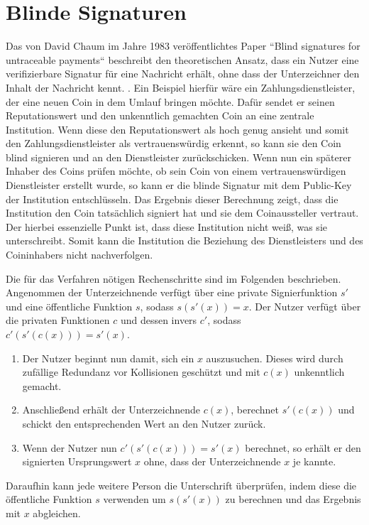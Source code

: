 \documentclass[
	fontsize=12pt,
	headings=small,
	parskip=half,           %
	bibliography=totoc,
	numbers=noenddot,       %
	open=any,               %
]{scrreprt}
\begin{document}
\section{Blinde Signaturen}
\label{sec:blindSig}
Das von David Chaum im Jahre 1983 veröffentlichtes Paper ``Blind signatures for untraceable payments`` beschreibt den theoretischen Ansatz, dass ein Nutzer eine verifizierbare Signatur für eine Nachricht erhält, ohne dass der Unterzeichner den Inhalt der Nachricht kennt. \cite{chaum1983blind}. Ein Beispiel hierfür wäre ein Zahlungsdienstleister, der eine neuen Coin in dem Umlauf bringen möchte. Dafür sendet er seinen Reputationswert und den unkenntlich gemachten Coin an eine zentrale Institution. Wenn diese den Reputationswert als hoch genug ansieht und somit den Zahlungsdienstleister als vertrauenswürdig erkennt, so kann sie den Coin blind signieren und an den Dienstleister zurückschicken. Wenn nun ein späterer Inhaber des Coins prüfen möchte, ob sein Coin von einem vertrauenswürdigen Dienstleister erstellt wurde, so kann er die blinde Signatur mit dem Public-Key der Institution entschlüsseln. Das Ergebnis dieser Berechnung zeigt, dass die Institution den Coin tatsächlich signiert hat und sie dem Coinaussteller vertraut. Der hierbei essenzielle Punkt ist, dass diese Institution nicht weiß, was sie unterschreibt. Somit kann die Institution die Beziehung des Dienstleisters und des Coininhabers nicht nachverfolgen. 

Die für das Verfahren nötigen Rechenschritte sind im Folgenden beschrieben. Angenommen der Unterzeichnende verfügt über eine private Signierfunktion $s'$ und eine öffentliche Funktion $s$, sodass $s(s'(x)) = x$. Der Nutzer verfügt über die privaten Funktionen $c$ und dessen invers $c'$, sodass $c'(s'(c(x))) = s'(x)$. 
\begin{enumerate}
    \item Der Nutzer beginnt nun damit, sich ein $x$ auszusuchen. Dieses wird durch zufällige Redundanz vor Kollisionen geschützt und mit $c(x)$ unkenntlich gemacht.
    \item Anschließend erhält der Unterzeichnende $c(x)$, berechnet $s'(c(x))$ und schickt den entsprechenden Wert an den Nutzer zurück.
    \item Wenn der Nutzer nun $c'(s'(c(x))) = s'(x)$ berechnet, so erhält er den signierten Ursprungswert $x$ ohne, dass der Unterzeichnende $x$ je kannte.
\end{enumerate}
Daraufhin kann jede weitere Person die Unterschrift überprüfen, indem diese die öffentliche Funktion $s$ verwenden um $s(s'(x))$ zu berechnen und das Ergebnis mit $x$ abgleichen. 
\end{document}
